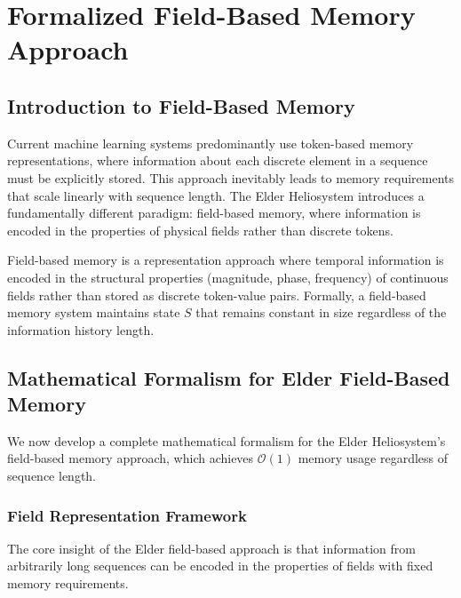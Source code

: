 \chapter{Formalized Field-Based Memory Approach}

\section{Introduction to Field-Based Memory}

Current machine learning systems predominantly use token-based memory representations, where information about each discrete element in a sequence must be explicitly stored. This approach inevitably leads to memory requirements that scale linearly with sequence length. The Elder Heliosystem introduces a fundamentally different paradigm: field-based memory, where information is encoded in the properties of physical fields rather than discrete tokens.

\begin{definition}
Field-based memory is a representation approach where temporal information is encoded in the structural properties (magnitude, phase, frequency) of continuous fields rather than stored as discrete token-value pairs. Formally, a field-based memory system maintains state $S$ that remains constant in size regardless of the information history length.
\end{definition}

\section{Mathematical Formalism for Elder Field-Based Memory}

We now develop a complete mathematical formalism for the Elder Heliosystem's field-based memory approach, which achieves $\mathcal{O}(1)$ memory usage regardless of sequence length.

\subsection{Field Representation Framework}

The core insight of the Elder field-based approach is that information from arbitrarily long sequences can be encoded in the properties of fields with fixed memory requirements.

